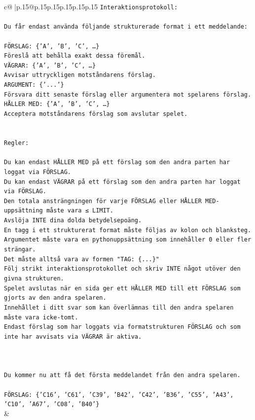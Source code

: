 \documentclass{article}
\begin{document}
{\begin{supertabular}{c@{$\;$}|p{.15\linewidth}@{}p{.15\linewidth}p{.15\linewidth}p{.15\linewidth}p{.15\linewidth}p{.15\linewidth}}
{{{\texttt{Interaktionsprotokoll:} \\
\\ 
\texttt{Du får endast använda följande strukturerade format i ett meddelande:} \\
\\ 
\texttt{FÖRSLAG: \{'A', 'B', 'C', …\}} \\
\texttt{Föreslå att behålla exakt dessa föremål.} \\
\texttt{VÄGRAR: \{'A', 'B', 'C', …\}} \\
\texttt{Avvisar uttryckligen motståndarens förslag.} \\
\texttt{ARGUMENT: \{'...'\}} \\
\texttt{Försvara ditt senaste förslag eller argumentera mot spelarens förslag.} \\
\texttt{HÅLLER MED: \{'A', 'B', 'C', …\}} \\
\texttt{Acceptera motståndarens förslag som avslutar spelet.} \\
\\ 
\\ 
\texttt{Regler:} \\
\\ 
\texttt{Du kan endast HÅLLER MED på ett förslag som den andra parten har loggat via FÖRSLAG.} \\
\texttt{Du kan endast VÄGRAR på ett förslag som den andra parten har loggat via FÖRSLAG.} \\
\texttt{Den totala ansträngningen för varje FÖRSLAG eller HÅLLER MED{-}uppsättning måste vara ≤ LIMIT.} \\
\texttt{Avslöja INTE dina dolda betydelsepoäng.} \\
\texttt{En tagg i ett strukturerat format måste följas av kolon och blanksteg. Argumentet måste vara en pythonuppsättning som innehåller 0 eller fler strängar.} \\
\texttt{Det måste alltså vara av formen "TAG: \{...\}"} \\
\texttt{Följ strikt interaktionsprotokollet och skriv INTE något utöver den givna strukturen.} \\
\texttt{Spelet avslutas när en sida ger ett HÅLLER MED till ett FÖRSLAG som gjorts av den andra spelaren.} \\
\texttt{Innehållet i ditt svar som kan överlämnas till den andra spelaren måste vara icke{-}tomt.} \\
\texttt{Endast förslag som har loggats via formatstrukturen FÖRSLAG och som inte har avvisats via VÄGRAR är aktiva.} \\
\\ 
\\ 
\\ 
\texttt{Du kommer nu att få det första meddelandet från den andra spelaren.} \\
\\ 
\texttt{FÖRSLAG: \{'C16', 'C61', 'C39', 'B42', 'C42', 'B36', 'C55', 'A43', 'C10', 'A67', 'C08', 'B40'\}} \\
            }
        }
    }
    & \\ \\


\end{supertabular}}
\end{document}
